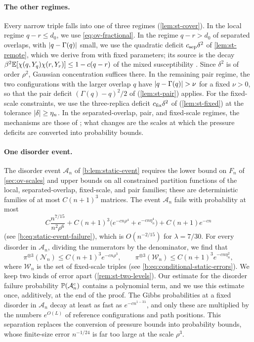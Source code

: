\paragraph{The other regimes.} Every narrow triple falls into one of three
regimes (\cref{lem:st-cover}). In the local regime $q-r\le d_0$, we use
\eqref{eq:ov-fractional}. In the regime $q-r>d_0$ of separated overlaps, with
$\lvert q-\Gamma(q)\rvert$ small, we use the quadratic deficit $c_{\rm sep}\delta^2$ of
\cref{lem:st-remote}, which we derive from
\cite[Section~7, Steps~1--7]{oai-barriers} with fixed parameters; its source is
the decay $\beta^2\mathbb E[\chi(q,Y_q)\chi(r,Y_r)]\le1-c(q-r)$ of the mixed
susceptibility \cite[(7.31)]{oai-barriers}. Since $\delta^2$ is of order
$\rho^2$, Gaussian concentration suffices there. In the
remaining pair regime, the two configurations with the larger overlap $q$ have
$\lvert q-\Gamma(q)\rvert>\nu$ for a fixed $\nu>0$, so that the pair deficit
$(\Gamma(q)-q)^2/2$ of \cite[Lemma~4.3]{oai-barriers} (\cref{lem:st-pair}) applies. For
the fixed-scale constraints, we use the three-replica deficit
$c_{\rm fix}\delta^2$ of \cite[(4.20)]{oai-barriers} (\cref{lem:st-fixed}) at
the tolerance $\lvert \delta\rvert\ge\eta_n$. In the separated-overlap, pair, and
fixed-scale regimes, the mechanisms are those of \cite{oai-barriers}; what
changes are the scales at which the pressure deficits are converted into
probability bounds.

\paragraph{One disorder event.} The disorder event $\mathcal A_n$ of
\cref{b:lem:static-event} requires the lower bound on $F_n$ of
\cref{sec:ov-scales} and upper bounds on all constrained partition functions
of the local, separated-overlap, fixed-scale, and pair families; these are
deterministic families of at most $C(n+1)^3$ matrices. The event
$\mathcal A_n$ fails with probability at most
\[
 C\frac{n^{7/15}}{n^2\rho^6}+C(n+1)^3\bigl(e^{-cn\rho^4}+e^{-cn\eta_n^4}\bigr)
 +C(n+1)e^{-cn}
\]
(see \eqref{b:eq:static-event-failure}), which is $O(n^{-2/15})$ for
$\lambda=7/30$. For every disorder in $\mathcal A_n$,
dividing the numerators by the denominator, we find that
\[
 \pi^{\otimes3}(\mathcal N_n)\le C(n+1)^3e^{-cn\rho^3},\qquad
 \pi^{\otimes3}(\mathcal W_n)\le C(n+1)^3e^{-cn\eta_n^2},
\]
where $\mathcal W_n$ is the set of fixed-scale triples
(see \eqref{b:eq:conditional-static-errors}). We keep two kinds of error apart
(\cref{rem:st-two-levels}). Our estimate for the disorder failure probability
$\mathbb P(\mathcal A_n^c)$ contains a polynomial term, and we use this estimate
once, additively, at the end of the proof. The Gibbs
probabilities at a fixed disorder in $\mathcal A_n$ decay at least as fast as
$e^{-cn^{1-3\lambda}}$, and only these are multiplied by the numbers $e^{O(L)}$
of reference configurations and path positions. This separation replaces the
conversion \cite[Lemma~4.2]{oai-barriers} of pressure bounds into probability
bounds, whose finite-size error $n^{-1/24}$ is far too large at the scale
$\rho^3$.

